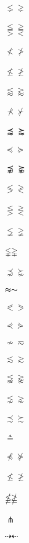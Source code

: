 \documentclass{article}
\begin{document}
$\lneq \gneq $\\\\
$\lesseqqgtr \gtreqqless $\\\\
$\nless \ngtr $\\\\
$\nleq \ngeq $\\\\
$\lessapprox \gtrapprox $\\\\
$\nprec \nsucc $\\\\
$\precapprox \succapprox $\\\\
$\preccurlyeq \succcurlyeq $\\\\
$\precnapprox \succnapprox $\\\\
$\lessgtr \gtrless $\\\\
$\lesseqgtr \gtreqless $\\\\
$\lneqq \gneqq $\\\\
$\lvertneqq \gvertneqq $\\\\
$\precnsim \succnsim $\\\\
$\thickapprox \thicksim$\\\\
$\eqslantless \eqslantgtr $\\\\
$\curlyeqprec \curlyeqsucc $\\\\
$\nsim \eqsim $\\\\
$\lesssim \gtrsim $\\\\
$\lnapprox \gnapprox $\\\\
$\lnsim \gnsim $\\\\
$\precsim \succsim $\\\\
$\triangleq $\\\\
$\npreceq \nsucceq $\\\\
$\nleqslant \ngeqslant $\\\\
$\nleqq \ngeqq $\\\\
$\pitchfork$\\\\
$\dashrightarrow \dashleftarrow$\\\\
\end{document}
